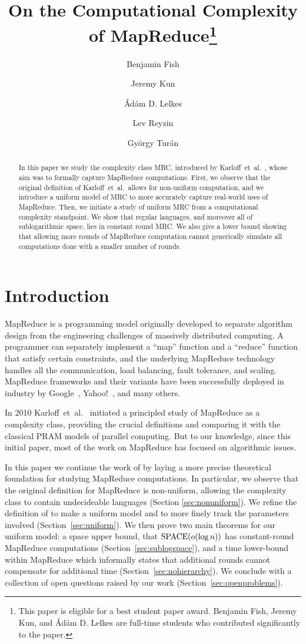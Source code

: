 \documentclass[11pt]{article}
\title{On the Computational Complexity of MapReduce\thanks{This paper is eligible for a best student paper award.
Benjamin Fish, Jeremy Kun, and \'Ad\'am D. Lelkes are full-time students who contributed significantly to the paper.}}
\date{}
\author{Benjamin Fish}
\author{Jeremy Kun}
\author{\'Ad\'am D. Lelkes}
\author{Lev Reyzin}
\author{Gy\"orgy Tur\'an}
\affil{
Department of Mathematics, Statistics, and Computer Science\\
University of Illinois at Chicago\\
Chicago, IL 60607\\
\texttt{\{bfish3,jkun2,alelke2,lreyzin,gyt\}@math.uic.edu}
}
\theoremstyle{definition}
\theoremstyle{remark}
\newcommand{\SPACE}{\textup{SPACE}}
\begin{document}
\maketitle

\begin{abstract} 
In this paper we study the complexity class MRC, introduced by
Karloff~et~al.~\cite{Karloff10}, whose aim was to formally capture MapReduce
computations. First, we observe that the original definition of Karloff~et~al.\
allows for non-uniform computation, and we introduce a uniform model of MRC to
more accurately capture real-world uses of MapReduce. Then, we initiate a study
of uniform MRC from a computational complexity standpoint. We show that regular
languages, and moreover all of sublogarithmic space, lies in constant round
MRC. We also give a lower bound showing that allowing more rounds of MapReduce
computation cannot generically simulate all computations done with a smaller
number of rounds.  \end{abstract}

\clearpage

\section{Introduction} 

MapReduce is a programming model originally developed to separate algorithm
design from the engineering challenges of massively distributed computing.  A
programmer can separately implement a ``map'' function and a ``reduce''
function that satisfy certain constraints, and the underlying MapReduce
technology handles all the communication, load balancing, fault tolerance, and
scaling.  MapReduce frameworks and their variants have been successfully
deployed in industry by Google~\cite{DeanG08}, Yahoo!~\cite{ShvachkoKRC10}, and
many others.

In 2010 Karloff~et~al.~\cite{Karloff10} initiated a principled study of
MapReduce as a complexity class, providing the crucial definitions and
comparing it with the classical PRAM models of parallel computing.  But to our
knowledge, since this initial paper, most of the work on MapReduce has focused
on algorithmic issues.

In this paper we continue the work of \cite{Karloff10} by laying a more precise
theoretical foundation for studying MapReduce computations. In particular, we
observe that the original definition for MapReduce is non-uniform, allowing the
complexity class to contain undecideable languages (Section
\ref{sec:nonuniform}). We refine the definition of \cite{Karloff10} to make a
uniform model and to more finely track the parameters involved
(Section~\ref{sec:uniform}). We then prove two main theorems for our uniform
model: a space upper bound, that $\SPACE(o(\log n))$ has constant-round
MapReduce computations (Section~\ref{sec:sublogspace}), and a time lower-bound
within MapReduce which informally states that additional rounds cannot
compensate for additional time (Section~\ref{sec:nohierarchy}).  We conclude
with a collection of open questions raised by our work
(Section~\ref{sec:openproblems}).
\end{document}
